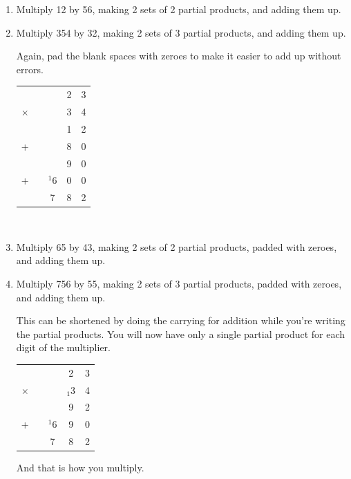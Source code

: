 \documentclass[12pt]{article}
\begin{document}
\begin{enumerate}
\item Multiply 12 by 56, making 2 sets of 2 partial products, and adding them up.
\item Multiply 354 by 32, making 2 sets of 3 partial products, and adding them up.

\vspace{32pt}
Again, pad the blank spaces with zeroes to make it easier to add up without errors.\\

\begin{center}
\begin{tabular}{c@{\,}c@{\,}c@{\,}c@{\,}c}
       & & &2&3\\
$\times$ & & &3&4\\
\hline
       & & &1&2\\
      +& & &8&0\\
\hline
       & & &9&0\\
  +& &$^{1}$6&0&0\\
\hline
       & &7&8&2\\
\hline
\hline
\end{tabular}\\
\end{center}

\item Multiply 65 by 43, making 2 sets of 2 partial products, padded with zeroes, and adding them up.
\item Multiply 756 by 55, making 2 sets of 3 partial products, padded with zeroes, and adding them up.

This can be shortened by doing the carrying for addition while you're writing the partial products. You will now have only a single partial product for each digit of the multiplier.

\begin{center}
\begin{tabular}{c@{\,}c@{\,}c@{\,}c@{\,}c}
       &&&2&3\\
$\times$ &&&$_{1}$3&4\\
\hline
       &&&9&2\\
+ &&$^{1}$6&9&0\\
\hline
      &&7&8&2\\
\hline
\hline
\end{tabular}
\end{center}

\vspace{32pt}
And that is how you multiply.\\


\end{enumerate}
\end{document}
